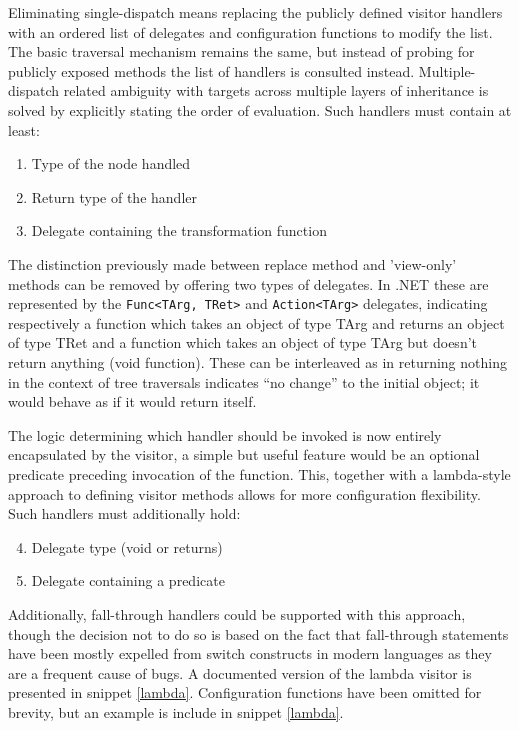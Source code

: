 \documentclass[twoside,openright]{uva-bachelor-thesis}
\newcommand{\code}[1]{\texttt{\footnotesize#1}}
\begin{document}
			Eliminating single-dispatch means replacing the publicly defined visitor handlers with an ordered list of delegates and configuration functions to modify the list. The basic traversal mechanism remains the same, but instead of probing for publicly exposed methods the list of handlers is consulted instead. Multiple-dispatch related ambiguity with targets across multiple layers of inheritance is solved by explicitly stating the order of evaluation. Such handlers must contain at least:
			\begin{enumerate}
				\item Type of the node handled
				\item Return type of the handler
				\item Delegate containing the transformation function
			\end{enumerate}
			
			The distinction previously made between replace method and 'view-only' methods can be removed by offering two types of delegates. In .NET these are represented by the \code{Func<TArg, TRet>} and \code{Action<TArg>}  delegates, indicating respectively a function which takes an object of type TArg and returns an object of type TRet and a function which takes an object of type TArg but doesn't return anything (void function). These can be interleaved as in returning nothing in the context of tree traversals indicates ``no change'' to the initial object; it would behave as if it would return itself.
			
			The logic determining which handler should be invoked is now entirely encapsulated by the visitor, a simple but useful feature would be an optional predicate preceding invocation of the function. This, together with a lambda-style approach to defining visitor methods allows for more configuration flexibility. Such handlers must additionally hold:
			\begin{enumerate}
				\setcounter{enumi}{3}
				\item Delegate type (void or returns)
				\item Delegate containing a predicate
			\end{enumerate}
						
			Additionally, fall-through handlers could be supported with this approach, though the decision not to do so is based on the fact that fall-through statements have been mostly expelled from switch constructs in modern languages as they are a frequent cause of bugs. A documented version of the lambda visitor is presented in snippet \ref{lambda}. Configuration functions have been omitted for brevity, but an example is include in snippet \ref{lambda}.
			
\end{document}
